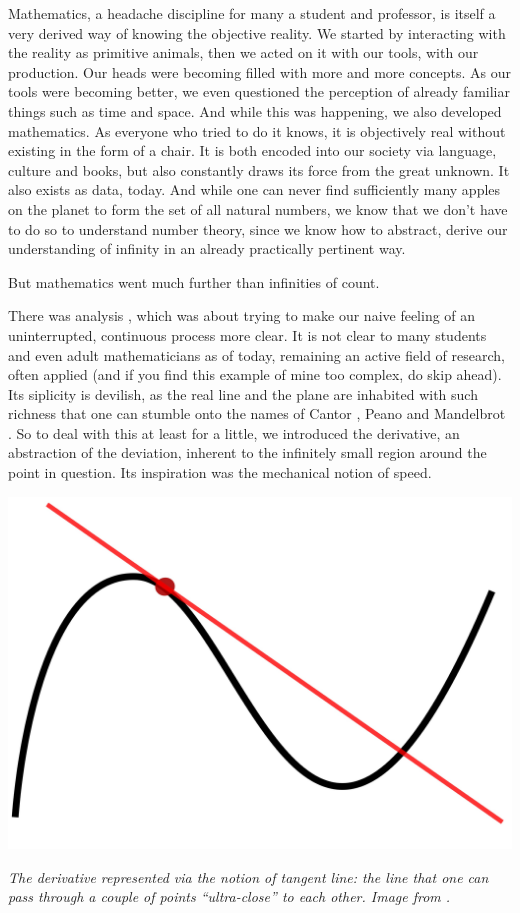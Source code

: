 \documentclass{article}
\begin{document}
Mathematics, a headache discipline for many a student and professor, is itself a very derived way of knowing the objective reality. We started by interacting with the reality as primitive animals, then we acted on it with our tools, with our production. Our heads were becoming filled with more and more concepts. As our tools were becoming better, we even questioned the perception of already familiar things such as time and space. And while this was happening, we also developed mathematics. As everyone who tried to do it knows, it is objectively real without existing in the form of a chair. It is both encoded into our society via language, culture and books, but also constantly draws its force from the great unknown. It also exists as data, today. And while one can never find sufficiently many apples on the planet to form the set of all natural numbers, we know that we don’t have to do so to understand number theory, since we know how to abstract, derive our understanding of infinity in an already practically pertinent way.

But mathematics went much further than infinities of count.

There was analysis \cite{ANALYSIS}, which was about trying to make our naive feeling of an uninterrupted, continuous process more clear. It is not clear to many students and even adult mathematicians as of today, remaining an active field of research, often applied (and if you find this example of mine too complex, do skip ahead). Its siplicity is devilish, as the real line and the plane are inhabited with such richness that one can stumble onto the names of Cantor \cite{CANTOR}, Peano \cite{PEANO} and Mandelbrot
\cite{MANDELBROT}. So to deal with this at least for a little, we introduced the derivative, an abstraction of the deviation, inherent to the infinitely small region around the point in question. Its inspiration was the mechanical notion of speed.

\begin{center}
\includegraphics[scale=0.05]{Tangent_to_a_curve.jpg}

\textit{The derivative represented via the notion of tangent line: the line that one can pass through a couple of points ``ultra-close'' to each other. Image from \cite{DERIVATIVE}.}
\end{center}
\end{document}
